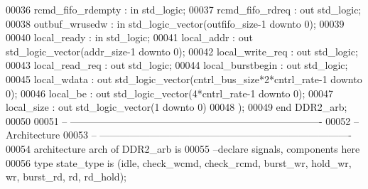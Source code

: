 \begin{DoxyCode}
00036         \textcolor{vhdlchar}{rcmd_fifo_rdempty}   \textcolor{vhdlchar}{:} \textcolor{keywordflow}{in} \textcolor{comment}{std\_logic};
00037         \textcolor{vhdlchar}{rcmd_fifo_rdreq} \textcolor{vhdlchar}{:} \textcolor{keywordflow}{out} \textcolor{comment}{std\_logic};
00038         \textcolor{vhdlchar}{outbuf_wrusedw}      \textcolor{vhdlchar}{:} \textcolor{keywordflow}{in} \textcolor{comment}{std\_logic\_vector}\textcolor{vhdlchar}{(}\textcolor{vhdlchar}{outfifo_size}\textcolor{vhdlchar}{-}\textcolor{vhdllogic}{}\textcolor{vhdllogic}{1} \textcolor{keywordflow}{downto} \textcolor{vhdllogic}{}\textcolor{vhdllogic}{0}\textcolor{vhdlchar}{)};
00039         
00040         local\_ready         : \textcolor{keywordflow}{in} \textcolor{comment}{std\_logic};
00041         local\_addr          : \textcolor{keywordflow}{out} \textcolor{comment}{std\_logic\_vector}(addr\_size-1 \textcolor{keywordflow}{downto} \textcolor{vhdllogic}{0});
00042         local\_write\_req : \textcolor{keywordflow}{out} \textcolor{comment}{std\_logic};
00043         local\_read\_req      : \textcolor{keywordflow}{out} \textcolor{comment}{std\_logic};
00044         local\_burstbegin    : \textcolor{keywordflow}{out} \textcolor{comment}{std\_logic};
00045         local\_wdata         : \textcolor{keywordflow}{out} \textcolor{comment}{std\_logic\_vector}(cntrl\_bus\_size*2*cntrl\_rate-1 \textcolor{keywordflow}{downto} \textcolor{vhdllogic}{0});
00046         local\_be                : \textcolor{keywordflow}{out} \textcolor{comment}{std\_logic\_vector}(4*cntrl\_rate-1 \textcolor{keywordflow}{downto} \textcolor{vhdllogic}{0});
00047         local\_size          : \textcolor{keywordflow}{out} \textcolor{comment}{std\_logic\_vector}(\textcolor{vhdllogic}{1} \textcolor{keywordflow}{downto} \textcolor{vhdllogic}{0})  
00048         \textcolor{vhdlchar}{)};
00049 \textcolor{keywordflow}{end} \textcolor{vhdlchar}{DDR2\_arb};
00050 
00051 \textcolor{keyword}{-- ----------------------------------------------------------------------------}
00052 \textcolor{keyword}{-- Architecture}
00053 \textcolor{keyword}{-- ----------------------------------------------------------------------------}
00054 \textcolor{keywordflow}{architecture} arch \textcolor{keywordflow}{of} DDR2_arb is
00055 \textcolor{keyword}{--declare signals,  components here}
00056 \textcolor{keywordflow}{type} \textcolor{vhdlchar}{state_type} \textcolor{keywordflow}{is} \textcolor{vhdlchar}{(}\textcolor{vhdlchar}{idle}\textcolor{vhdlchar}{,} \textcolor{vhdlchar}{check\_wcmd}\textcolor{vhdlchar}{,} \textcolor{vhdlchar}{check\_rcmd}\textcolor{vhdlchar}{,} \textcolor{vhdlchar}{burst\_wr}\textcolor{vhdlchar}{,} \textcolor{vhdlchar}{hold\_wr}\textcolor{vhdlchar}{,} \textcolor{vhdlchar}{wr}\textcolor{vhdlchar}{,} \textcolor{vhdlchar}{burst\_rd}\textcolor{vhdlchar}{,} \textcolor{vhdlchar}{rd}\textcolor{vhdlchar}{,} \textcolor{vhdlchar}{rd\_hold}\textcolor{vhdlchar}{)};

\end{DoxyCode}
